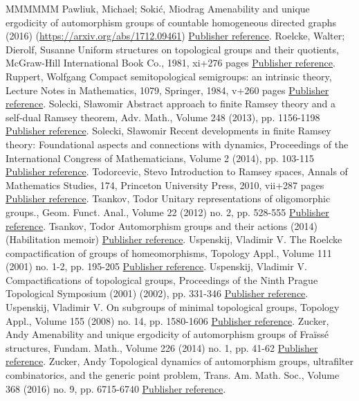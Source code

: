 \documentclass[11pt]{article}
\theoremstyle{definition}
\numberwithin{equation}{section}
\numberwithin{figure}{section}
\numberwithin{table}{section}
\begin{document}
\begin{thebibliography}{MMMMMM}
 Pawliuk, Michael; Sokić, Miodrag Amenability and unique ergodicity of automorphism groups of countable homogeneous directed graphs (2016) (\url{https://arxiv.org/abs/1712.09461}) \href{https://ahl.centre-mersenne.org/item/AHL_2019__2__149_0/#PS}{Publisher reference}.
 Roelcke, Walter; Dierolf, Susanne Uniform structures on topological groups and their quotients, McGraw-Hill International Book Co., 1981, xi+276 pages \href{https://ahl.centre-mersenne.org/item/AHL_2019__2__149_0/#RD}{Publisher reference}.
 Ruppert, Wolfgang Compact semitopological semigroups: an intrinsic theory, Lecture Notes in Mathematics, 1079, Springer, 1984, v+260 pages \href{https://ahl.centre-mersenne.org/item/AHL_2019__2__149_0/#Ru}{Publisher reference}.
 Solecki, Sławomir Abstract approach to finite Ramsey theory and a self-dual Ramsey theorem, Adv. Math., Volume 248 (2013), pp. 1156-1198 \href{https://ahl.centre-mersenne.org/item/AHL_2019__2__149_0/#Sol4}{Publisher reference}.
 Solecki, Sławomir Recent developments in finite Ramsey theory: Foundational aspects and connections with dynamics, Proceedings of the International Congress of Mathematicians, Volume 2 (2014), pp. 103-115 \href{https://ahl.centre-mersenne.org/item/AHL_2019__2__149_0/#Sol6}{Publisher reference}.
 Todorcevic, Stevo Introduction to Ramsey spaces, Annals of Mathematics Studies, 174, Princeton University Press, 2010, vii+287 pages \href{https://ahl.centre-mersenne.org/item/AHL_2019__2__149_0/#T}{Publisher reference}.
 Tsankov, Todor Unitary representations of oligomorphic groups., Geom. Funct. Anal., Volume 22 (2012) no. 2, pp. 528-555 \href{https://ahl.centre-mersenne.org/item/AHL_2019__2__149_0/#Ts}{Publisher reference}.
 Tsankov, Todor Automorphism groups and their actions (2014) (Habilitation memoir) \href{https://ahl.centre-mersenne.org/item/AHL_2019__2__149_0/#Ts1}{Publisher reference}.
 Uspenskij, Vladimir V. The Roelcke compactification of groups of homeomorphisms, Topology Appl., Volume 111 (2001) no. 1-2, pp. 195-205 \href{https://ahl.centre-mersenne.org/item/AHL_2019__2__149_0/#Us3}{Publisher reference}.
 Uspenskij, Vladimir V. Compactifications of topological groups, Proceedings of the Ninth Prague Topological Symposium (2001) (2002), pp. 331-346 \href{https://ahl.centre-mersenne.org/item/AHL_2019__2__149_0/#Us4}{Publisher reference}.
 Uspenskij, Vladimir V. On subgroups of minimal topological groups, Topology Appl., Volume 155 (2008) no. 14, pp. 1580-1606 \href{https://ahl.centre-mersenne.org/item/AHL_2019__2__149_0/#Us5}{Publisher reference}.
 Zucker, Andy Amenability and unique ergodicity of automorphism groups of Fraïssé structures, Fundam. Math., Volume 226 (2014) no. 1, pp. 41-62 \href{https://ahl.centre-mersenne.org/item/AHL_2019__2__149_0/#Z1}{Publisher reference}.
 Zucker, Andy Topological dynamics of automorphism groups, ultrafilter combinatorics, and the generic point problem, Trans. Am. Math. Soc., Volume 368 (2016) no. 9, pp. 6715-6740 \href{https://ahl.centre-mersenne.org/item/AHL_2019__2__149_0/#Z2}{Publisher reference}.
\end{thebibliography}
\end{document}
